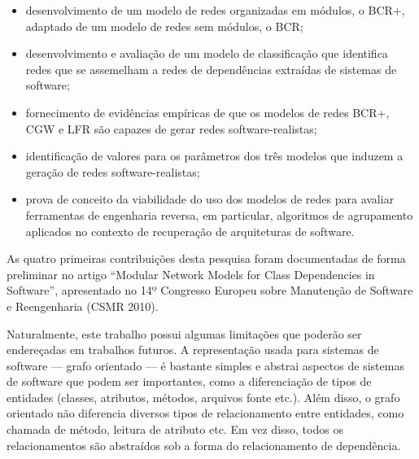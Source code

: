 \begin{itemize}
	\item desenvolvimento de um modelo de redes organizadas em módulos, o BCR+, adaptado de um modelo de redes sem módulos, o BCR;
	\item desenvolvimento e avaliação de um modelo de classificação que identifica redes que se assemelham a redes de dependências extraídas de sistemas de software;
	\item fornecimento de evidências empíricas de que os modelos de redes BCR+, CGW e LFR são capazes de gerar redes software-realistas;
	\item identificação de valores para os parâmetros dos três modelos que induzem a geração de redes software-realistas;
	\item prova de conceito da viabilidade do uso dos modelos de redes para avaliar ferramentas de engenharia reversa, em particular, algoritmos de agrupamento aplicados no contexto de recuperação de arquiteturas de software. 
\end{itemize}

As quatro primeiras contribuições desta pesquisa foram documentadas de forma preliminar no artigo ``Modular Network Models for Class Dependencies in Software'', apresentado no 14º Congresso Europeu sobre Manutenção de Software e Reengenharia (CSMR 2010). 


Naturalmente, este trabalho possui algumas limitações que poderão ser endereçadas em trabalhos futuros. A representação usada para sistemas de software --- grafo orientado --- é bastante simples e abstrai aspectos de sistemas de software que podem ser importantes, como a diferenciação de tipos de entidades (classes, atributos, métodos, arquivos fonte etc.). Além disso, o grafo orientado não diferencia diversos tipos de relacionamento entre entidades, como chamada de método, leitura de atributo etc. Em vez disso, todos os relacionamentos são abstraídos sob a forma do relacionamento de dependência.

